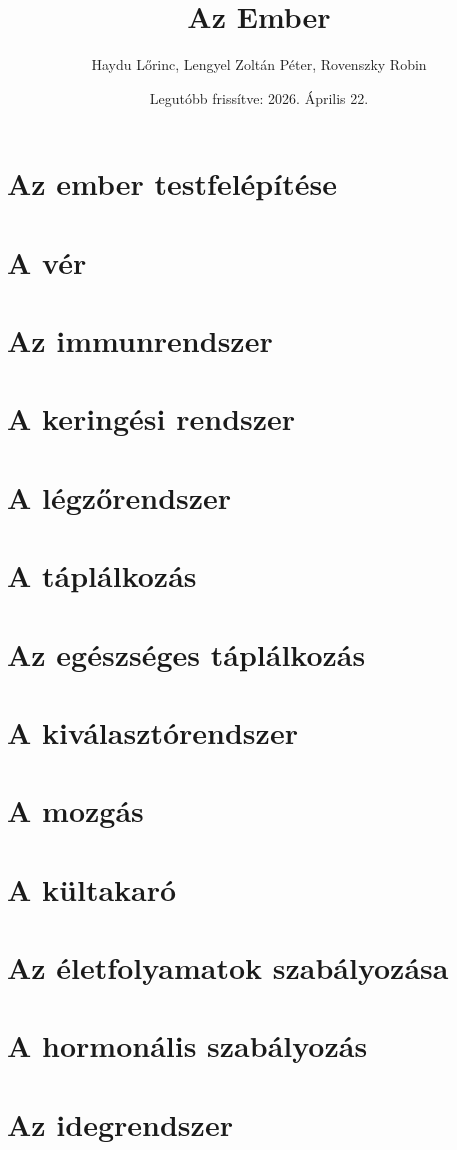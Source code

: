 \documentclass{article}
\title{Az Ember}
\author{Haydu Lőrinc, Lengyel Zoltán Péter, Rovenszky Robin}
\date{Legutóbb frissítve: 2026. Április 22.}
\begin{document}
\maketitle
\tableofcontents
\newpage

\section{Az ember testfelépítése}
\section{A vér} %
\section{Az immunrendszer} %
\section{A keringési rendszer}
\section{A légzőrendszer}
\section{A táplálkozás}
\section{Az egészséges táplálkozás}
\section{A kiválasztórendszer}
\section{A mozgás}
\section{A kültakaró}
\section{Az életfolyamatok szabályozása} %
\section{A hormonális szabályozás}
\section{Az idegrendszer}
\end{document}
